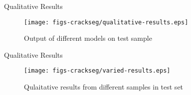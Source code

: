 \documentclass{libs/curtin_format}
\begin{document}
\begin{frame}{Qualitative Results}
   \begin{figure}
        \centering        
        \texttt{[image: figs-crackseg/qualitative-results.eps]}
        \caption{Output of different models on test sample}
        \label{fig:pipeline}
    \end{figure}
\end{frame}

\begin{frame}{Qualitative Results}
   \begin{figure}
        \centering        
        \texttt{[image: figs-crackseg/varied-results.eps]}
        \caption{Qulaitative results from different samples in test set}
        \label{fig:pipeline}
    \end{figure}
\end{frame}
\end{document}
